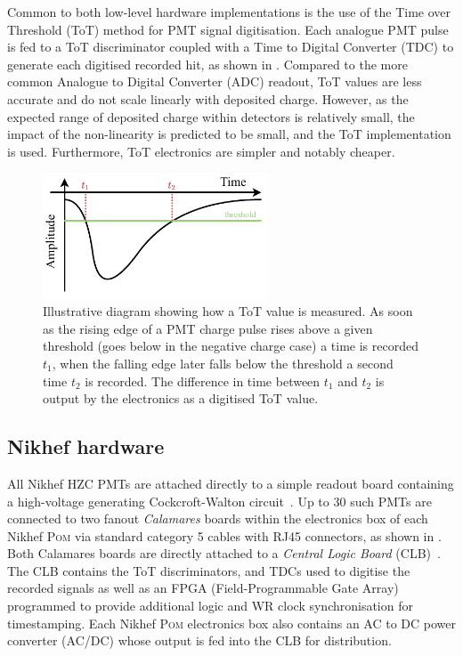 Common to both low-level hardware implementations is the use of the Time over Threshold (ToT)
method for PMT signal digitisation. Each analogue PMT pulse is fed to a ToT discriminator coupled
with a Time to Digital Converter (TDC) to generate each digitised recorded hit, as shown in
. Compared to the more common Analogue to Digital Converter (ADC) readout, ToT
values are less accurate and do not scale linearly with deposited charge. However, as the expected
range of deposited charge within \chips detectors is relatively small, the impact of the
non-linearity is predicted to be small, and the ToT implementation is used. Furthermore, ToT
electronics are simpler and notably cheaper.

\begin{figure} %
    \includegraphics[width=0.6\textwidth]{diagrams/5-daq/tot.pdf}
    \caption[Illustrative diagram showing how Time over Threshold is measured]
    {Illustrative diagram showing how a ToT value is measured. As soon as the rising edge of a PMT
        charge pulse rises above a given threshold (goes below in the negative charge case) a time
        is recorded $t_{1}$, when the falling edge later falls below the threshold a second time
        $t_{2}$ is recorded. The difference in time between $t_{1}$ and $t_{2}$ is output by the
        electronics as a digitised ToT value.}
    \label{fig:tot}
\end{figure}

\subsection{Nikhef hardware} %
\label{sec:daq_hard_Nikhed} %

All Nikhef HZC PMTs are attached directly to a simple readout board containing a high-voltage
generating Cockcroft-Walton circuit~\cite{cockcroft1932}. Up to 30 such PMTs are connected to two
fanout \emph{Calamares} boards within the electronics box of each Nikhef \textsc{Pom} via standard
category 5 cables with RJ45 connectors, as shown in . Both Calamares
boards are directly attached to a \emph{Central Logic Board} (CLB)~\cite{biagi2015, eijk2015}. The
CLB contains the ToT discriminators, and TDCs used to digitise the recorded signals as well as an
FPGA (Field-Programmable Gate Array) programmed to provide additional logic and WR clock
synchronisation for timestamping. Each Nikhef \textsc{Pom} electronics box also contains an AC to
DC power converter (AC/DC) whose output is fed into the CLB for distribution.

